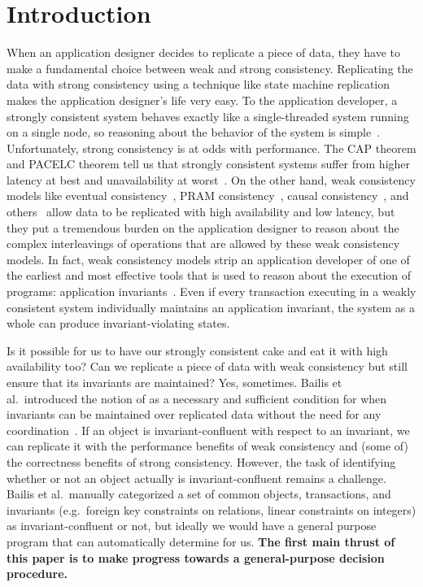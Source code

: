 \section{Introduction}
When an application designer decides to replicate a piece of data, they have to
make a fundamental choice between weak and strong consistency. Replicating the
data with strong consistency using a technique like state machine
replication~\cite{schneider1990implementing, lamport1998part,
liskov2012viewstamped, ongaro2014search, moraru2013there, vincent2015designing,
oki1988viewstamped, lamport2005generalized, lamport2006fast} makes the
application designer's life very easy. To the application developer, a strongly
consistent system behaves exactly like a single-threaded system running on a
single node, so reasoning about the behavior of the system is
simple~\cite{herlihy1990linearizability}.  Unfortunately, strong consistency is
at odds with performance. The CAP theorem and PACELC theorem tell us that
strongly consistent systems suffer from higher latency at best and
unavailability at worst~\cite{gilbert2002brewer, brewer2012cap,
abadi2012consistency}. On the other hand, weak consistency models like
eventual consistency~\cite{vogels2009eventually}, PRAM consistency~\cite{lipton1988pram},
causal consistency~\cite{ahamad1995causal}, and others~\cite{lloyd2011don,
mehdi2017can} allow data to be replicated with high availability and low
latency, but they put a tremendous burden on the application designer to reason
about the complex interleavings of operations that are allowed by these weak
consistency models. In fact, weak consistency models strip an application
developer of one of the earliest and most effective tools that is used to
reason about the execution of programs: application
invariants~\cite{hoare1969axiomatic, balegas2015towards}. Even if every
transaction executing in a weakly consistent system individually maintains an
application invariant, the system as a whole can produce invariant-violating
states.

Is it possible for us to have our strongly consistent cake and eat it with high
availability too? Can we replicate a piece of data with weak consistency but
still ensure that its invariants are maintained? Yes, sometimes. Bailis et al.\
introduced the notion of \invariantconfluence{} as a necessary and sufficient
condition for when invariants can be maintained over replicated data without
the need for any coordination~\cite{bailis2014coordination}. If an object is
invariant-confluent with respect to an invariant, we can replicate it with the
performance benefits of weak consistency and (some of) the correctness benefits
of strong consistency. However, the task of identifying whether or not an
object actually is invariant-confluent remains a challenge. Bailis et al.\
manually categorized a set of common objects, transactions, and invariants
(e.g.\ foreign key constraints on relations, linear constraints on integers) as
invariant-confluent or not, but ideally we would have a general purpose program
that can automatically determine \invariantconfluence{} for us. \textbf{The first
main thrust of this paper is to make progress towards a general-purpose
\invariantconfluence{} decision procedure.}

